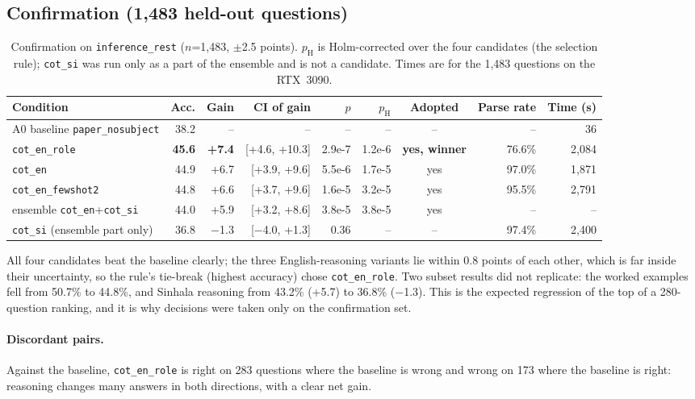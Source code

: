 \documentclass[10pt,a4paper]{article}
\newcommand{\best}[1]{\textbf{\textcolor{best}{#1}}}
\newcommand{\cond}[1]{\texttt{#1}}
\begin{document}
\subsection{Confirmation (1,483 held-out questions)}
\begin{table}[h]
\centering\footnotesize\setlength{\tabcolsep}{4pt}
\begin{tabular}{lrrrrrcrr}
\toprule
Condition & Acc. & Gain & CI of gain & $p$ & $p_\text{H}$ & Adopted & Parse rate & Time (s)\\
\midrule
A0 baseline \cond{paper\_nosubject} & 38.2 & -- & -- & -- & -- & -- & -- & 36\\
\cond{cot\_en\_role} & \best{45.6} & \best{+7.4} & [+4.6, +10.3] & 2.9e-7 & 1.2e-6 & \textbf{yes, winner} & 76.6\% & 2,084\\
\cond{cot\_en} & 44.9 & +6.7 & [+3.9, +9.6] & 5.5e-6 & 1.7e-5 & yes & 97.0\% & 1,871\\
\cond{cot\_en\_fewshot2} & 44.8 & +6.6 & [+3.7, +9.6] & 1.6e-5 & 3.2e-5 & yes & 95.5\% & 2,791\\
ensemble \cond{cot\_en}+\cond{cot\_si} & 44.0 & +5.9 & [+3.2, +8.6] & 3.8e-5 & 3.8e-5 & yes & -- & --\\
\cond{cot\_si} (ensemble part only) & 36.8 & $-$1.3 & [$-$4.0, +1.3] & 0.36 & -- & -- & 97.4\% & 2,400\\
\bottomrule
\end{tabular}
\caption{Confirmation on \texttt{inference\_rest} ($n$=1,483, $\pm$2.5 points). $p_\text{H}$ is Holm-corrected over the
four candidates (the selection rule); \cond{cot\_si} was run only as a part of the ensemble and is not a candidate.
Times are for the 1,483 questions on the RTX~3090.}
\label{tab:confirm}
\end{table}

All four candidates beat the baseline clearly; the three English-reasoning variants lie within 0.8 points of each other,
which is far inside their uncertainty, so the rule's tie-break (highest accuracy) chose \cond{cot\_en\_role}.
Two subset results did not replicate: the worked examples fell from 50.7\% to 44.8\%, and Sinhala reasoning from
43.2\% (+5.7) to 36.8\% ($-$1.3). This is the expected regression of the top of a 280-question ranking, and it is why
decisions were taken only on the confirmation set.

\paragraph{Discordant pairs.} Against the baseline, \cond{cot\_en\_role} is right on 283 questions where the baseline is
wrong and wrong on 173 where the baseline is right: reasoning changes many answers in both directions, with a clear
net gain.
\end{document}
